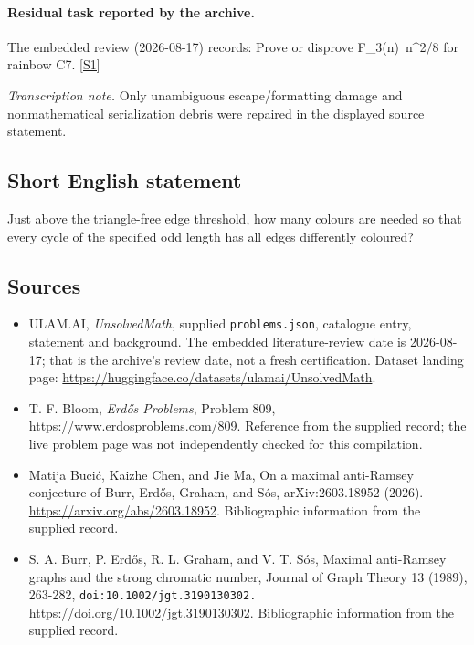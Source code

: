 \documentclass[11pt,a4paper]{article}
\newcommand{\sref}[2]{\hyperlink{source:#1:#2}{[S#2]}}
\begin{document}
\paragraph{Residual task reported by the archive.}

The embedded review (2026-08-17) records: Prove or disprove F\_3(n)~n\textasciicircum{}2/8 for rainbow C7. \sref{statement}{1}

{\small\emph{Transcription note.} Only unambiguous escape/formatting damage and nonmathematical serialization debris were repaired in the displayed source statement.}

\subsection{Short English statement}

Just above the triangle-free edge threshold, how many colours are needed so that every cycle of the specified odd length has all edges differently coloured?

\subsection{Sources}

{\small

\begin{itemize}

\item[\hypertarget{source:statement:1}{S1}] ULAM.AI, \emph{UnsolvedMath}, supplied \texttt{problems.json}, catalogue entry, statement and background. The embedded literature-review date is 2026-08-17; that is the archive’s review date, not a fresh certification. Dataset landing page: \url{https://huggingface.co/datasets/ulamai/UnsolvedMath}.

\item[\hypertarget{source:statement:2}{S2}] T. F. Bloom, \emph{Erdős Problems}, Problem 809, \url{https://www.erdosproblems.com/809}. Reference from the supplied record; the live problem page was not independently checked for this compilation.

\item[\hypertarget{source:statement:3}{S3}] Matija Bucić, Kaizhe Chen, and Jie Ma, On a maximal anti-Ramsey conjecture of Burr, Erdős, Graham, and Sós, arXiv:2603.18952 (2026). \url{https://arxiv.org/abs/2603.18952}. Bibliographic information from the supplied record.

\item[\hypertarget{source:statement:4}{S4}] S. A. Burr, P. Erdős, R. L. Graham, and V. T. Sós, Maximal anti-Ramsey graphs and the strong chromatic number, Journal of Graph Theory 13 (1989), 263-282, \nolinkurl{doi:10.1002/jgt.3190130302.} \url{https://doi.org/10.1002/jgt.3190130302}. Bibliographic information from the supplied record.

\end{itemize}

}

\label{end:statement}
\end{document}
